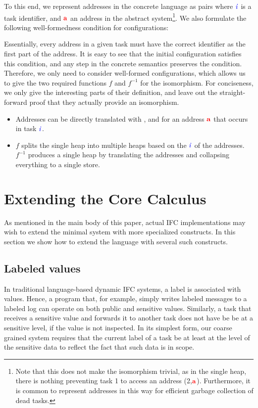 \documentclass{llncs}
\newcommand{\Varid}[1]{\mathit{#1}}
\begin{document}
To this end, we represent addresses in the concrete language as
pairs  where \ensuremath{\ifc{\Varid{i}}} is a task identifier, and \ensuremath{\tar{a}} an
address in the abstract system\footnote{Note that this does
  not make the isomorphism trivial, as in the single heap, there
  is nothing preventing task 1 to access an address (2,\ensuremath{\tar{a}}).
  Furthermore, it is common to represent addresses in this way
  for efficient garbage collection of dead tasks.}.
We also formulate the following well-formedness condition for
configurations:

Essentially, every address in a given task must have the correct
identifier as the first part of the address.  It is easy to
see that the initial configuration satisfies this condition, and
any step in the concrete semantics preserves the condition.
Therefore, we only need to consider well-formed configurations,
which allows us to give the two required functions
\ensuremath{\Varid{f}} and \ensuremath{\Varid{f}^{-1}} for the isomorphism.  For conciseness, we only give
the interesting parts of their definition,
and leave out the straight-forward proof that they
actually provide an isomorphism.
\begin{itemize}
  \item Addresses can be directly translated with
  , and  for
  an address \ensuremath{\tar{a}} that occurs in task \ensuremath{\ifc{\Varid{i}}}.
  \item \ensuremath{\Varid{f}} splits the single heap into multiple heaps based on
  the \ensuremath{\ifc{\Varid{i}}} of the addresses.  \ensuremath{\Varid{f}^{-1}} produces a single heap
  by translating the addresses and collapsing everything to a single
  store.
\end{itemize}




\section{Extending the Core Calculus}
\label{sec:appendix-extensions}

As mentioned in the main body of this paper,
actual IFC implementations
may wish to extend the minimal system with more specialized
constructs.
In this section we show how to extend the language with several such
constructs.


\subsection{Labeled values}
In traditional language-based dynamic IFC systems, a label is
associated with values.
Hence, a program that, for example, simply writes labeled messages to
a labeled log can operate on both public and sensitive values.
Similarly, a task that receives a sensitive value and forwards it
to another task does not have be be at a sensitive level, if the
value is not inspected.
In its simplest form, our coarse grained system requires that the
current label of a task be at least at the level of the sensitive data
to reflect the fact that such data is in scope.
\end{document}
